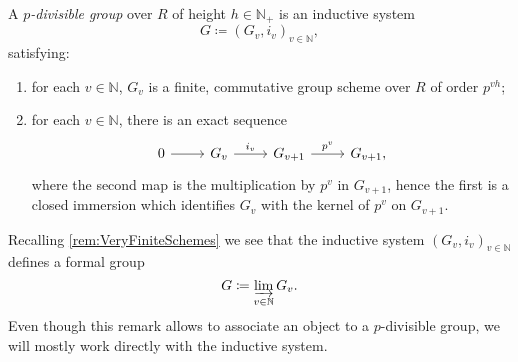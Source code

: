 \documentclass[../Main]{subfiles}
\begin{document}
\begin{defn}\label{defn:pDivGroupFormalSchemes}
	A {\em $p$-divisible group} over $R$ of height $h \in \mathbb{N}_+$ is an inductive system
	\begin{equation*}
	G \coloneqq \left(G_v, i_v\right)_{v \in \mathbb{N}}
	,\end{equation*} 
	satisfying:
	\begin{enumerate}
		\item for each $v \in \mathbb{N}$, $G_v$ is a finite, commutative group scheme over $R$
			of order $p^{v h}$;
		\item for each $v \in \mathbb{N}$, there is an exact sequence
			\begin{equation*}
			\begin{tikzcd}
				0 \arrow[r, "", rightarrow] &
				G_v \arrow[r, "i_v", rightarrow] &
				G_{v + 1} \arrow[r, "p^v", rightarrow] &
				G_{v + 1} 
			,\end{tikzcd}
			\end{equation*}
			where the second map is the multiplication by $p^v$ in $G_{v + 1}$,
			hence the first is a closed immersion which identifies
			$G_v$ with the kernel of $p^v$ on $G_{v+1}$.
	\end{enumerate}
\end{defn}


\begin{rem}[]
	Recalling \cref{rem:VeryFiniteSchemes} we see that the inductive system 
	$\left( G_v, i_v \right)_{v \in \mathbb{N}}$ defines a formal group 
	\begin{equation*}
	G \coloneqq \varinjlim_{v \in \mathbb{N}} G_v
	.\end{equation*}
	Even though this remark allows to associate an object to a $p$-divisible 
	group, we will mostly work directly with the inductive system.
\end{rem}
\end{document}
